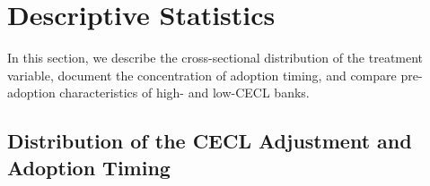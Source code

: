
\section{Descriptive Statistics}
\label{sec:descriptive}

In this section, we describe the cross-sectional distribution of the treatment
variable, document the concentration of adoption timing, and compare pre-adoption
characteristics of high- and low-CECL banks.

\subsection{Distribution of the CECL Adjustment and Adoption Timing}
\label{sec:descriptive:distribution}

